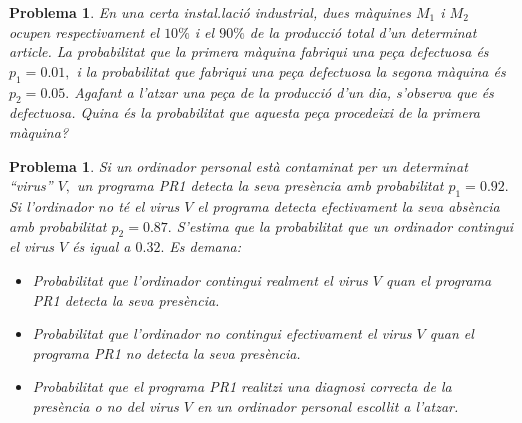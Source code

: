 \documentclass[11pt]{article}
\newcounter{prbcont}
\newtheorem{problema}[prbcont]{Problema}
\begin{document}
\begin{problema}
En una certa instal.laci\'o industrial, dues m\`aquines $M_1$ i $M_2$ ocupen respectivament el $10\%$ i el $90\%$ de la producci\'o total d'un determinat article. La probabilitat que la primera m\`aquina fabriqui una pe\c{c}a defectuosa \'es $p_1 = 0.01,$ i la probabilitat que fabriqui una pe\c{c}a defectuosa la segona m\`aquina \'es $p_2 = 0.05.$ Agafant a l'atzar una pe\c{c}a de la producci\'o d'un dia, s'observa que \'es defectuosa. Quina \'es la probabilitat
que aquesta pe\c{c}a procedeixi de la primera m\`aquina? %
\end{problema}


\begin{problema}
Si un ordinador personal est\`a contaminat per un determinat ``virus''  $V,$ un programa PR1 detecta la seva pres\`encia amb probabilitat $p_1 = 0.92.$ Si l'ordinador no t\'e el virus $V$ el programa detecta efectivament la seva abs\`encia amb probabilitat $p_2 = 0.87.$ S'estima que la probabilitat que un ordinador contingui el virus $V$ \'es igual a $0.32.$ Es demana:
\begin{itemize}
\item [(a)] Probabilitat que l'ordinador contingui realment el virus $V$ quan el programa PR1 detecta la seva pres\`encia. %
\item [(b)] Probabilitat que l'ordinador no contingui efectivament el virus $V$ quan el programa PR1 no detecta la seva pres\`encia. %
\item [(c)] Probabilitat que el programa PR1 realitzi una diagnosi correcta de la pres\`encia o no del virus $V$ en un ordinador personal escollit a l'atzar. %
\end{itemize}
\end{problema}
\end{document}
